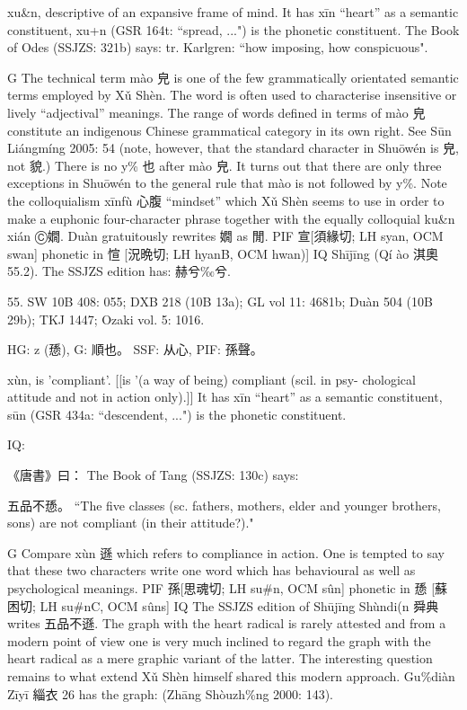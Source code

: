 xu&n,
descriptive of an expansive frame of mind. It has xīn ``heart'' as a semantic constituent,
xu+n (GSR 164t: ``spread, ...") is the phonetic constituent.
The Book of Odes (SSJZS: 321b) says:
tr. Karlgren: ``how imposing, how conspicuous".

G The technical term mào 皃 is one of the few grammatically orientated semantic terms employed by Xǔ Shèn. The word is often used to characterise insensitive or lively ``adjectival'' meanings. The range of words defined in terms of mào 皃 constitute an indigenous Chinese grammatical category in its own right. See Sūn Liángmíng 2005: 54 (note, however, that the standard character in Shuōwén is 皃, not 貌.)
There is no y\% 也 after mào 皃. It turns out that there are only three exceptions in Shuōwén to
the general rule that mào is not followed by y\%.
    Note the colloquialism xīnfù 心腹 ``mindset'' which Xǔ Shèn seems to use in order to make a euphonic four-character phrase together with the equally colloquial ku&n xián Ⓒ嫺.
Duàn gratuitously rewrites 嫺 as 閒.
PIF     宣[須緣切; LH syan, OCM swan] phonetic in 愃 [況晩切; LH hyanB, OCM hwan)]
IQ	Shījīng (Qí ào 淇奧 55.2). The SSJZS edition has: 赫兮‰兮.

55. SW 10B 408: 055; DXB 218 (10B 13a); GL vol 11: 4681b; Duàn 504 (10B 29b); TKJ 1447; Ozaki vol. 5: 1016.

HG:  z (愻),
G:	順也。
SSF: 从心,
PIF: 孫聲。


xùn,
is 'compliant'. [[is '(a way of being) compliant (scil. in psy- chological attitude and not in action only).]]
It has xīn ``heart'' as a semantic constituent,
sūn (GSR 434a: ``descendent, ...") is the phonetic constituent.

IQ:

《唐書》曰： The Book of Tang (SSJZS: 130c) says:

五品不愻。 ``The five classes (sc. fathers, mothers, elder and younger brothers, sons) are not compliant (in their attitude?)."



G Compare xùn 遜 which refers to compliance in action. One is tempted to say that these two characters write one word which has behavioural as well as psychological meanings.
PIF   孫[思魂切; LH su\#n, OCM sûn] phonetic in 愻 [蘇困切; LH su\#nC, OCM sûns]
IQ The SSJZS edition of Shūjīng Shùndi(n 舜典 writes 五品不遜. The graph with the heart radical is rarely attested and from a modern point of view one is very much inclined to regard the graph with the heart radical as a mere graphic variant of the latter. The interesting question remains to what extend Xǔ Shèn himself shared this modern approach.
Gu\%diàn Zīyī 緇衣 26 has the graph:    (Zhāng Shòuzh\%ng 2000: 143).

